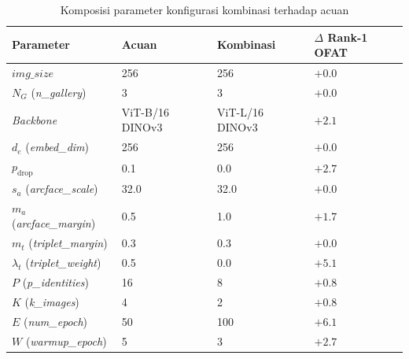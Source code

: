 \begin{table}[htbp]
    \centering
    \caption{Komposisi parameter konfigurasi kombinasi terhadap acuan}
    \label{tab:combo_config}
    \renewcommand{\arraystretch}{1.25}
    \begin{tabular}{llll}
        \hline
        \textbf{Parameter}                               & \textbf{Acuan}    & \textbf{Kombinasi} & \textbf{$\Delta$ Rank-1 OFAT} \\
        \hline
        $\mathit{img\_size}$                             & 256               & 256                & $+0{.}0$                      \\
        $N_G$ (\textit{n\_gallery})                      & 3                 & 3                  & $+0{.}0$                      \\
        \textit{Backbone}                                & ViT-B{/}16 DINOv3 & ViT-L{/}16 DINOv3  & $+2{.}1$                      \\
        $d_e$ (\textit{embed\_dim})                      & 256               & 256                & $+0{.}0$                      \\
        $p_{\text{drop}}$                                & 0{.}1             & 0{.}0              & $+2{.}7$                      \\
        $s_a$ (\textit{arcface\_scale})                  & 32{.}0            & 32{.}0             & $+0{.}0$                      \\
        $m_a$ (\textit{arcface\_margin})                 & 0{.}5             & 1{.}0              & $+1{.}7$                      \\
        $m_t$ (\textit{triplet\_margin})                 & 0{.}3             & 0{.}3              & $+0{.}0$                      \\
        $\lambda_t$ (\textit{triplet\_weight})           & 0{.}5             & 0{.}0              & $+5{.}1$                      \\
        $P$ (\textit{p\_identities})                     & 16                & 8                  & $+0{.}8$                      \\
        $K$ (\textit{k\_images})                         & 4                 & 2                  & $+0{.}8$                      \\
        $E$ (\textit{num\_epoch})                        & 50                & 100                & $+6{.}1$                      \\
        $W$ (\textit{warmup\_epoch})                     & 5                 & 3                  & $+2{.}7$                      \\

\end{tabular}
\end{table}
